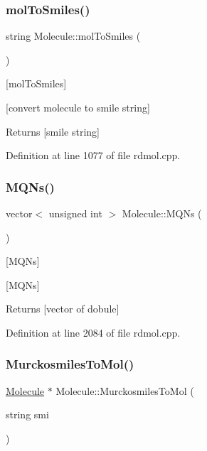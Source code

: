 \subsubsection{\texorpdfstring{mol\+To\+Smiles()}{molToSmiles()}}
{\footnotesize\ttfamily string Molecule\+::mol\+To\+Smiles (\begin{DoxyParamCaption}{ }\end{DoxyParamCaption})}



\mbox{[}mol\+To\+Smiles\mbox{]} 

\mbox{[}convert molecule to smile string\mbox{]}

\begin{DoxyReturn}{Returns}
\mbox{[}smile string\mbox{]} 
\end{DoxyReturn}


Definition at line 1077 of file rdmol.\+cpp.

\mbox{\label{class_molecule_a982b663705ea294980bdb56458dc9bd1}} 
\subsubsection{\texorpdfstring{M\+Q\+Ns()}{MQNs()}}
{\footnotesize\ttfamily vector$<$ unsigned int $>$ Molecule\+::\+M\+Q\+Ns (\begin{DoxyParamCaption}{ }\end{DoxyParamCaption})}



\mbox{[}M\+Q\+Ns\mbox{]} 

\mbox{[}M\+Q\+Ns\mbox{]}

\begin{DoxyReturn}{Returns}
\mbox{[}vector of dobule\mbox{]} 
\end{DoxyReturn}


Definition at line 2084 of file rdmol.\+cpp.

\mbox{\label{class_molecule_af46950eda08b8532e75f9bf83a07ead7}} 
\subsubsection{\texorpdfstring{Murckosmiles\+To\+Mol()}{MurckosmilesToMol()}}
{\footnotesize\ttfamily \mbox{\hyperlink{class_molecule}{Molecule}} $\ast$ Molecule\+::\+Murckosmiles\+To\+Mol (\begin{DoxyParamCaption}\item[{string}]{smi }\end{DoxyParamCaption})\hspace{0.3cm}{\ttfamily [static]}}



